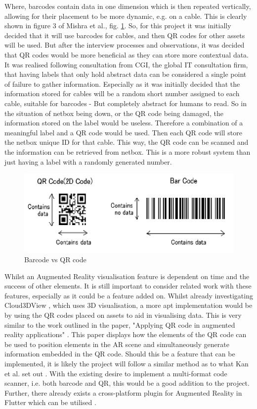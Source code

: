 \documentclass [11pt,a4paper]{article}
\begin{document}
Where, barcodes contain data in one dimension which is then repeated vertically, allowing for their placement to be more dynamic, e.g. on a cable. This is clearly shown in figure 3 of Mishra et al., fig. \ref{fig:barcode}. So, for this project it was initially decided that it will use barcodes for cables, and then QR codes for other assets will be used. But after the interview processes and observations, it was decided that QR codes would be more beneficial as they can store more contextual data. It was realised following consultation from CGI, the global IT consultation firm, that having labels that only hold abstract data can be considered a single point of failure to gather information. Especially as it was initially decided that the information stored for cables will be a random short number assigned to each cable, suitable for barcodes - But completely abstract for humans to read. So in the situation of netbox being down, or the QR code being damaged, the information stored on the label would be useless. Therefore a combination of a meaningful label and a QR code would be used. Then each QR code will store the netbox unique ID for that cable. This way, the QR code can be scanned and the information can be retrieved from netbox. This is a more robust system than just having a label with a randomly generated number.

\begin{figure}[H]
\centering
\includegraphics[width=.75\textwidth]{images/barcode_mishra.png}
\caption{Barcode vs QR code}
\label{fig:barcode}
\end{figure}

Whilst an Augmented Reality visualisation feature is dependent on time and the success of other elements. It is still important to consider related work with these features, especially as it could be a feature added on. Whilst already investigating Cloud3DView \cite{cloud3dview}, which uses 3D visualisation, a more apt implementation would be by using the QR codes placed on assets to aid in visualising data. This is very similar to the work outlined in the paper, "Applying QR code in augmented reality applications" \cite{applyingQR}. This paper displays how the elements of the QR code can be used to position elements in the AR scene and simultaneously generate information embedded in the QR code. Should this be a feature that can be implemented, it is likely the project will follow a similar method as to what Kan et al. set out \cite{applyingQR}. With the existing desire to implement a multi-format code scanner, i.e. both barcode and QR, this would be a good addition to the project. Further, there already exists a cross-platform plugin for Augmented Reality in Flutter which can be utilised \cite{ar_flutter}.
\end{document}
